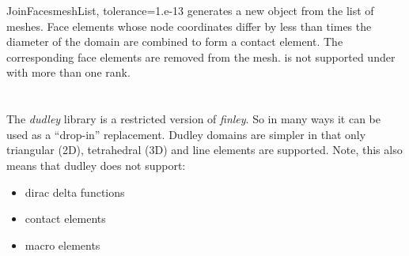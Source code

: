 \begin{funcdesc}{JoinFaces}{meshList, tolerance=1.e-13}
generates a new \Domain object from the list  of \finley meshes.
Face elements whose node coordinates differ by less than  times
the diameter of the domain are combined to form a contact element.
The corresponding face elements are removed from the mesh.
 is not supported under \MPI with more than one rank.
\end{funcdesc}

\section{\dudley}
\label{sec:dudley}
The {\it dudley} library is a restricted version of {\it finley}.
So in many ways it can be used as a ``drop-in'' replacement.
Dudley domains are simpler in that only triangular (2D), tetrahedral (3D) and line elements are supported.
Note, this also means that dudley does not support:
\begin{itemize}
\item dirac delta functions
\item contact elements
\item macro elements
\end{itemize}

